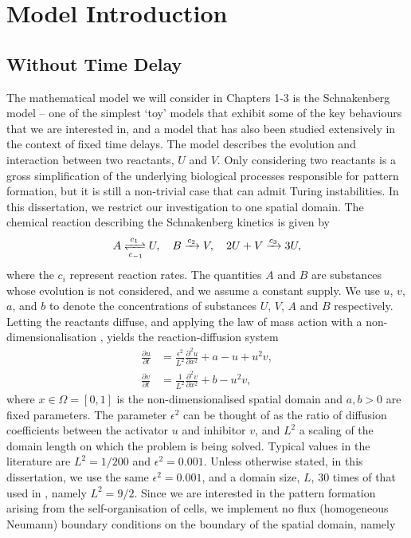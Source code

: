 \section{Model Introduction}
\subsection{Without Time Delay}
The mathematical model we will consider in Chapters 1-3 is the Schnakenberg model \cite{schnakenberg} -- one of the simplest `toy' models that exhibit some of the key behaviours that we are interested in, and a model that has also been studied extensively in the context of fixed time delays. The model describes the evolution and interaction between two reactants, $U$ and $V$. Only considering two reactants is a gross simplification of the underlying biological processes responsible for pattern formation, but it is still a non-trivial case that can admit Turing instabilities. In this dissertation, we restrict our investigation to one spatial domain. The chemical reaction describing the Schnakenberg kinetics \cite{baker} is given by
\begin{equation}\label{chem}
A\xrightleftharpoons[c_{-1}]{c_1} U,\quad B\xrightarrow{c_2} V,\quad 2U+V\xrightarrow{c_3} 3U,
\end{equation}
where the $c_i$ represent reaction rates. The quantities $A$ and $B$ are substances whose evolution is not considered, and we assume a constant supply. We use $u$, $v$, $a$, and $b$ to denote the concentrations of substances $U$, $V$, $A$ and $B$ respectively. Letting the reactants diffuse, and applying the law of mass action with a non-dimensionalisation \cite{murray}, yields the reaction-diffusion system
\begin{equation}\label{system}
    \begin{split}
    \frac{\partial u}{\partial t}&=\frac{\epsilon^2}{L^2}\frac{\partial^2 u}{\partial x^2}+a-u+u^2v,\\
    \frac{\partial v}{\partial t}&=\frac{1}{L^2}\frac{\partial^2 v}{\partial x^2}+b-u^2v,
    \end{split}
\end{equation}
where $x\in\Omega=[0,1]$ is the non-dimensionalised spatial domain and $a,b>0$ are fixed parameters. The parameter $\epsilon^2$ can be thought of as the ratio of diffusion coefficients between the activator $u$ and inhibitor $v$, and $L^2$ a scaling of the domain length on which the problem is being solved. Typical values in the literature \cite{gaffmonk} are $L^2=1/200$ and $\epsilon^2=0.001$. Unless otherwise stated, in this dissertation, we use the same $\epsilon^2=0.001$, and a domain size, $L$, $30$ times of that used in \cite{gaffmonk}, namely $L^2=9/2$. Since we are interested in the pattern formation arising from the self-organisation of cells, we implement no flux (homogeneous Neumann) boundary conditions on the boundary of the spatial domain, namely
